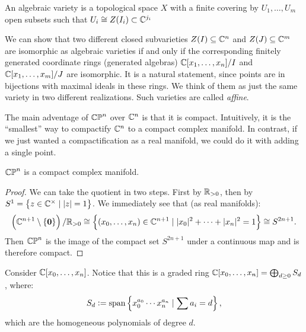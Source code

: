 \documentclass[11pt,a4paper]{article}
\begin{document}
\begin{definition}
  An algebraic variety is a topological space $X$ with a finite covering by
  $U_1,\dots,U_m$
  open subsets such that $U_i \cong Z(I_i) \subset \mathbb{C}^{j_i}$
\end{definition}

\begin{remark}
  We can show that two different closed subvarieties $Z(I) \subseteq \mathbb{C}^n$
  and $Z(J) \subseteq \mathbb{C}^m$ are isomorphic as algebraic varieties
  if and only if the corresponding finitely generated coordinate rings
  (generated algebras) $\mathbb{C}[x_1,\dots,x_n]/I$ and $\mathbb{C}[x_1,\dots,x_m]/J$
  are isomorphic.
  It is a natural statement, since points are in bijections with
  maximal ideals in these rings. We think of them as just the same variety in
  two different realizations. Such varieties are called \textit{affine}.
\end{remark}

\begin{remark}
  The main adventage of $\mathbb{CP}^n$ over $\mathbb{C}^{n}$ is that it is compact.
  Intuitively, it is the ``smallest'' way to compactify $\mathbb{C}^n$ to a compact
  complex manifold.
  In contrast, if we just wanted a compactification as a real manifold,
  we could do it with adding a single point.
\end{remark}

\begin{theorem}
  $\mathbb{CP}^n$ is a compact complex manifold.
\end{theorem}
\begin{proof}
  We can take the quotient in two steps.
  First by $\mathbb{R}_{> 0}$, then by $S^1 = \left\{z \in \mathbb{C}^{\times} \mid |z| = 1\right\}$.
  We immediately see that (as real manifolds):
  \[
    \del{\C^{n+1} \setminus \set{\vec 0}} / \R_{> 0} \cong
    \set{(x_0,\dots,x_n) \in \C^{n+1} \mid |x_0|^2 + \cdots + |x_n|^2 = 1}
    \cong S^{2n + 1}.
  \]
  Then $\mathbb{CP}^n$ is the image of the compact set $S^{2n + 1}$ under a continuous
  map and is therefore compact.
\end{proof}

\begin{definition}
  Consider $\mathbb{C}[x_0,\dots,x_n]$.
  Notice that this is a graded ring $\mathbb{C}[x_0,\dots,x_n] = \bigoplus_{d \geq 0} S_d$,
  where:
  \[
    S_d := \operatorname{span}\left\{x_0^{a_0} \cdots x_n^{a_n} \mid \sum a_i = d\right\},
  \]
  which are the homogeneous polynomials of degree $d$.
\end{definition}
\end{document}
